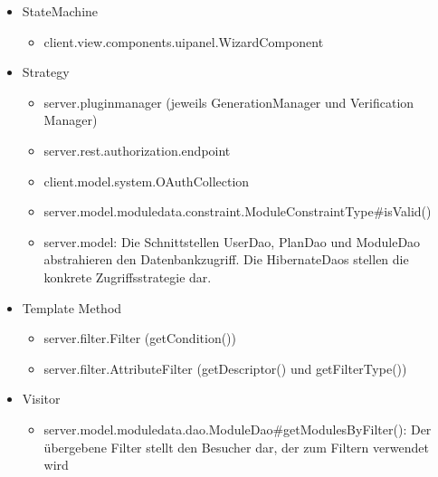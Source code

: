 \begin{itemize}
	\item StateMachine
		\begin{itemize}
			\item client.view.components.uipanel.WizardComponent
		\end{itemize}
	
	\item Strategy
		\begin{itemize}
			\item server.pluginmanager (jeweils GenerationManager und Verification Manager)
			\item server.rest.authorization.endpoint
			\item client.model.system.OAuthCollection
			\item server.model.moduledata.constraint.ModuleConstraintType\#isValid()
			\item server.model: Die Schnittstellen UserDao, PlanDao und ModuleDao abstrahieren den Datenbankzugriff. Die HibernateDaos stellen die konkrete Zugriffsstrategie dar.
		\end{itemize}
	
	\item Template Method
		\begin{itemize}
			\item server.filter.Filter (getCondition())
			\item server.filter.AttributeFilter (getDescriptor() und getFilterType())
		\end{itemize}
	\item Visitor
		\begin{itemize}
			\item server.model.moduledata.dao.ModuleDao\#getModulesByFilter(): Der übergebene Filter stellt den Besucher dar, der zum Filtern verwendet wird
		\end{itemize}
\end{itemize}